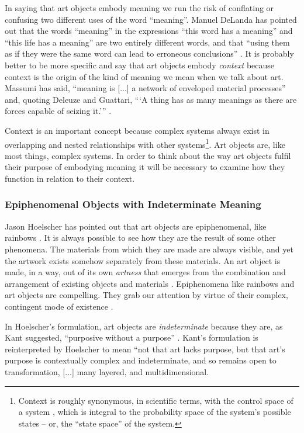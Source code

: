 \documentclass[letter:wpaper]{article}
\begin{document}
    In saying that art objects embody meaning we run the risk of conflating or confusing two different uses of the word “meaning”. Manuel DeLanda has pointed out that the words “meaning” in the expressions “this word has a meaning” and “this life has a meaning” are two entirely different words, and that “using them as if they were the same word can lead to erroneous conclusions” \citep[pp.40–41]{DeLandaCsltyAndMnng2018}. It is probably better to be more specific and say that art objects embody \emph{context} because context is the origin of the kind of meaning we mean when we talk about art. Massumi has said, “meaning is [...] a network of enveloped material processes” and, quoting Deleuze and Guattari, “‘A thing has as many meanings as there are forces capable of seizing it.’” \citep[p.10]{MassumiAUsrsGdTCptlsmAndSchzphrn1992}.

    Context is an important concept because complex systems always exist in overlapping and nested relationships with other systems\footnote{
        Context is roughly synonymous, in scientific terms, with the control space of a system \citep[p.130]{DeLandaAssmblgThry2016}, which is integral to the probability space of the system's possible states – or, the “state space” of the system.
    }. Art objects are, like most things, complex systems. In order to think about the way art objects fulfil their purpose of embodying meaning it will be necessary to examine how they function in relation to their context.
    
    \subsubsection{Epiphenomenal Objects with Indeterminate Meaning}

    Jason Hoelscher has pointed out that art objects are epiphenomenal, like rainbows \citep[p.17]{HoelscherArtAsInfrmtn2021}. It is always possible to see how they are the result of some other phenomena. The materials from which they are made are always visible, and yet the artwork exists somehow separately from these materials. An art object is made, in a way, out of its own \emph{artness} that emerges from the combination and arrangement of existing objects and materials \citep[p.2]{HoelscherThPtcsOfPhsSpc2014}. Epiphenomena like rainbows and art objects are compelling. They grab our attention by virtue of their complex, contingent mode of existence \citep[p.18]{HoelscherThPtcsOfPhsSpc2014}. 
    
    In Hoelscher's formulation, art objects are \emph{indeterminate} because they are, as Kant suggested, “purposive without a purpose” \citep[p.57]{KantCrtqOfJdgmnt}. Kant's formulation is reinterpreted by Hoelscher to mean “not that art lacks purpose, but that art's purpose is contextually complex and indeterminate, and so remains open to transformation, [...] many layered, and multidimensional.\citep[p.25]{HoelscherThPtcsOfPhsSpc2014}
\end{document}
